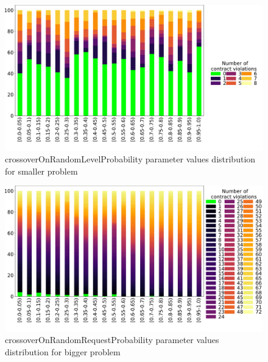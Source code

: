 \begin{figure}
	\centering
	\includegraphics[width=\textwidth]{images/DistrValiditySmall/crossoverOnRandomLevelProbability.pdf}
	\caption[crossoverOnRandomLevelProbability parameter values distribution for smaller problem]{crossoverOnRandomLevelProbability parameter values distribution for smaller problem}
	\label{fig:crossoverOnRandomLevelProbability_DistSmall}
\end{figure}
\begin{figure}
	\centering
	\includegraphics[width=\textwidth]{images/DistrValidityBig/crossoverOnRandomRequestProbability.pdf}
	\caption[crossoverOnRandomRequestProbability parameter values distribution for bigger problem]{crossoverOnRandomRequestProbability parameter values distribution for bigger problem}
	\label{fig:crossoverOnRandomRequestProbability_DistBig}
\end{figure}
